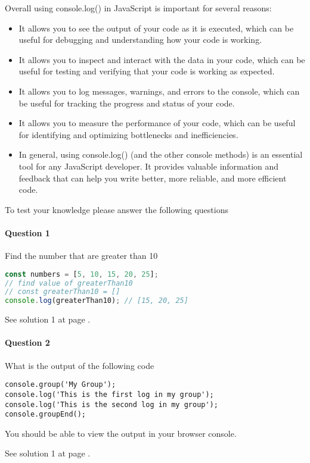 {Overall using console.log() in JavaScript is important for several reasons:
\begin{itemize}
\item It allows you to see the output of your code as it is executed, which can be useful for debugging and understanding how your code is working.
\item  It allows you to inspect and interact with the data in your code, which can be useful for testing and verifying that your code is working as expected.
\item  It allows you to log messages, warnings, and errors to the console, which can be useful for tracking the progress and status of your code.
\item It allows you to measure the performance of your code, which can be useful for identifying and optimizing bottlenecks and inefficiencies.
\item In general, using console.log() (and the other console methods) is an essential tool for any JavaScript developer. It provides valuable information and feedback that can help you write better, more reliable, and more efficient code.
\end{itemize}


To test your knowledge please answer the following questions

\paragraph{Question 1}
Find the number that are greater than 10 \label{ex:1}
\begin{lstlisting}[language=Javascript, nolol]
const numbers = [5, 10, 15, 20, 25];
// find value of greaterThan10
// const greaterThan10 = []
console.log(greaterThan10); // [15, 20, 25]

\end{lstlisting}

See solution 1 at page \pageref{sol:1}.
}

\paragraph{Question 2}

What is the output of the following code  \label{ex:2}
\begin{lstlisting}[nolol]
console.group('My Group');
console.log('This is the first log in my group');
console.log('This is the second log in my group');
console.groupEnd();
\end{lstlisting}

You should be able to view the output in your browser console.

See solution 1 at page \pageref{sol:2}.


\cleanalldata